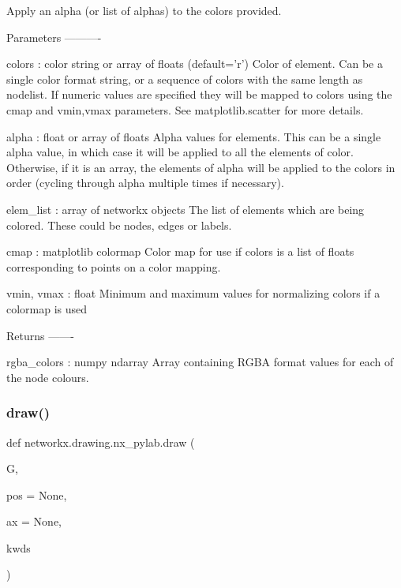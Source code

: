 \begin{DoxyVerb}Apply an alpha (or list of alphas) to the colors provided.

Parameters
----------

colors : color string or array of floats (default='r')
    Color of element. Can be a single color format string,
    or a sequence of colors with the same length as nodelist.
    If numeric values are specified they will be mapped to
    colors using the cmap and vmin,vmax parameters.  See
    matplotlib.scatter for more details.

alpha : float or array of floats
    Alpha values for elements. This can be a single alpha value, in
    which case it will be applied to all the elements of color. Otherwise,
    if it is an array, the elements of alpha will be applied to the colors
    in order (cycling through alpha multiple times if necessary).

elem_list : array of networkx objects
    The list of elements which are being colored. These could be nodes,
    edges or labels.

cmap : matplotlib colormap
    Color map for use if colors is a list of floats corresponding to points
    on a color mapping.

vmin, vmax : float
    Minimum and maximum values for normalizing colors if a colormap is used

Returns
-------

rgba_colors : numpy ndarray
    Array containing RGBA format values for each of the node colours.\end{DoxyVerb}
 \mbox{\label{namespacenetworkx_1_1drawing_1_1nx__pylab_ad6f777a242efbef8330552f619f2b635}} 
\subsubsection{\texorpdfstring{draw()}{draw()}}
{\footnotesize\ttfamily def networkx.\+drawing.\+nx\+\_\+pylab.\+draw (\begin{DoxyParamCaption}\item[{}]{G,  }\item[{}]{pos = {\ttfamily None},  }\item[{}]{ax = {\ttfamily None},  }\item[{}]{kwds }\end{DoxyParamCaption})}

